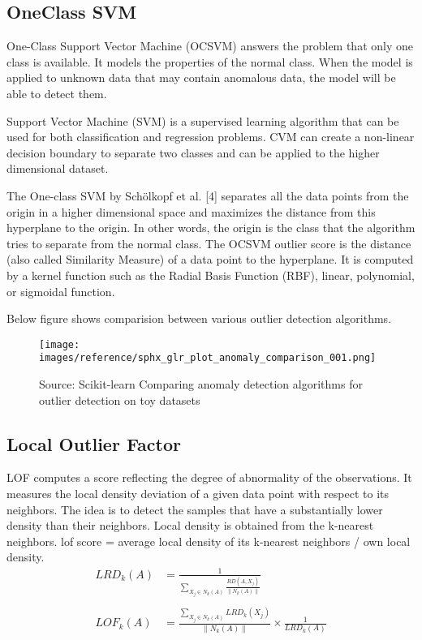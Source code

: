 \documentclass{article}
\begin{document}
\subsection{OneClass SVM}
One-Class Support Vector Machine (OCSVM) \cite{seven} answers the problem that only one class is available. It models the properties of the normal class. When the model is applied to unknown data that may contain anomalous data, the model will be able to detect them.\par
Support Vector Machine (SVM) is a supervised learning algorithm that can be used for both classification and regression problems. CVM can create a non-linear decision boundary to separate two classes and can be applied to the higher dimensional dataset. \par
The One-class SVM by Schölkopf et al. [4] separates all the data points from the origin in a higher dimensional space and maximizes the distance from this hyperplane to the origin. In other words, the origin is the class that the algorithm tries to separate from the normal class. The OCSVM outlier score is the distance (also called Similarity Measure) of a data point to the hyperplane. It is computed by a kernel function such as the Radial Basis Function (RBF), linear, polynomial, or sigmoidal function. \par
Below figure shows comparision between various outlier detection algorithms. \par
    \begin{figure}[!ht]       
        \texttt{[image: images/reference/sphx\_glr\_plot\_anomaly\_comparison\_001.png]}
        \caption{Source: Scikit-learn Comparing anomaly detection algorithms for outlier detection on toy datasets \cite{sixteen}}
        \label{fig:scikit-learn-algo-comparison}        
    \end{figure}

\subsection{Local Outlier Factor}
LOF\cite{eight} computes a score reflecting the degree of abnormality of the observations. It measures the local density deviation of a given data point with respect to its neighbors. The idea is to detect the samples that have a substantially lower density than their neighbors. Local density is obtained from the k-nearest neighbors. 
lof score = average local density of its k-nearest neighbors / own local density.
\begin{equation}
    \begin{split}
        LRD_k(A) &= \frac{1}{\sum_{X_j \in N_k(A)}\frac{RD(A,X_j)}{\lVert N_k(A) \rVert}} \\ \\
        LOF_k(A) &= \frac{\sum_{X_j \in N_k(A)}LRD_k(X_j)}{\lVert N_k(A) \rVert} \times \frac{1}{LRD_k(A)} \\
    \end{split}
\end{equation}
\end{document}
